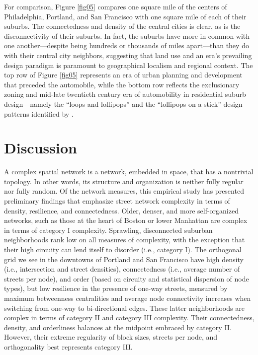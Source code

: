 \documentclass{article}
\begin{document}
For comparison, Figure \ref{fig05} compares one square mile of the centers of Philadelphia, Portland, and San Francisco with one square mile of each of their suburbs. The connectedness and density of the central cities is clear, as is the disconnectivity of their suburbs. In fact, the suburbs have more in common with one another---despite being hundreds or thousands of miles apart---than they do with their central city neighbors, suggesting that land use and an era's prevailing design paradigm is paramount to geographical localism and regional context. The top row of Figure \ref{fig05} represents an era of urban planning and development that preceded the automobile, while the bottom row reflects the exclusionary zoning and mid-late twentieth century era of automobility in residential suburb design---namely the \enquote{loops and lollipops} and the \enquote{lollipops on a stick} design patterns identified by \citet{southworth_streets_1997}.



\section{Discussion}

A complex spatial network is a network, embedded in space, that has a nontrivial topology. In other words, its structure and organization is neither fully regular nor fully random. Of the network measures, this empirical study has presented preliminary findings that emphasize street network complexity in terms of density, resilience, and connectedness. Older, denser, and more self-organized networks, such as those at the heart of Boston or lower Manhattan are complex in terms of category I complexity. Sprawling, disconnected suburban neighborhoods rank low on all measures of complexity, with the exception that their high circuity can lend itself to disorder (i.e., category I). The orthogonal grid we see in the downtowns of Portland and San Francisco have high density (i.e., intersection and street densities), connectedness (i.e., average number of streets per node), and order (based on circuity and statistical dispersion of node types), but low resilience in the presence of one-way streets, measured by maximum betweenness centralities and average node connectivity increases when switching from one-way to bi-directional edges. These latter neighborhoods are complex in terms of category II and category III complexity. Their connectedness, density, and orderliness balances at the midpoint embraced by category II. However, their extreme regularity of block sizes, streets per node, and orthogonality best represents category III.
\end{document}
